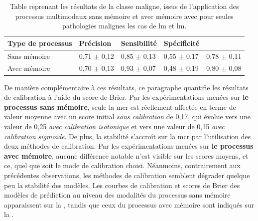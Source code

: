 \begin{table}[H]
    \centering
    \begin{tabular}{lllll}
        \toprule 
        Type de processus   & Précision             & Sensibilité           & Spécificité           & \Fscore{}             \\ \midrule
        Sans mémoire        & 0,71 $\pm$ 0,12 	    & 0,85 $\pm$ 0,13 	    & 0,55 $\pm$ 0,17 	    & 0,78 $\pm$ 0,11         \\ \midrule
        Avec mémoire        & 0,70 $\pm$ 0,13 	    & 0,93 $\pm$ 0,07 	    & 0,48 $\pm$ 0,19 	    & 0,80 $\pm$ 0,08         \\ \bottomrule
    \end{tabular}
    \caption{Table reprenant les résultats de la classe maligne, issus de l'application des processus multimodaux sans mémoire et avec mémoire avec pour seules pathologies malignes les cas de \gls{lm} et \gls{lm}.}
    \label{tab:results_multimodal_process_lm}
\end{table}

De manière complémentaire à ces résultats, ce paragraphe quantifie les résultats de calibration à l'aide du score de Brier. Par les expérimentations menées sur \textbf{le processus sans mémoire}, seule la \gls{mcr} est réellement affectée en terme de valeur moyenne avec un score initial \textit{sans calibration} de 0,17, qui évolue vers une valeur de 0,25 \textit{avec calibration isotonique} et vers une valeur de 0,15 \textit{avec calibration sigmoïde}. De plus, la stabilité s'accroît sur la \gls{mcr} par l'utilisation des deux méthodes de calibration. Par les expérimentations menées sur \textbf{le processus avec mémoire}, aucune différence notable n'est visible sur les scores moyens, et ce, quel que soit le mode de calibration choisi. Néanmoins, contrairement aux précédentes observations, les méthodes de calibration semblent dégrader quelque peu la stabilité des modèles. Les courbes de calibration et scores de Brier des modèles de prédiction au niveau des modalités du processus sans mémoire apparaissent sur la , tandis que ceux du processus avec mémoire sont indiqués sur la .\par


